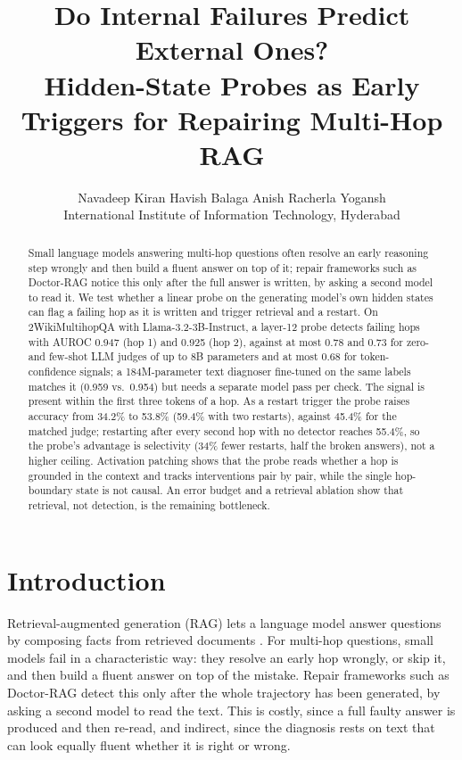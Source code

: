 \documentclass[11pt]{article}
\title{Do Internal Failures Predict External Ones?\\
Hidden-State Probes as Early Triggers for Repairing Multi-Hop RAG}
\author{Navadeep Kiran \quad Havish Balaga \quad Anish Racherla \quad Yogansh \\
  International Institute of Information Technology, Hyderabad}
\begin{document}
\maketitle

\begin{abstract}
Small language models answering multi-hop questions often resolve an early reasoning step wrongly and then build a fluent answer on top of it; repair frameworks such as Doctor-RAG notice this only after the full answer is written, by asking a second model to read it. We test whether a linear probe on the generating model's own hidden states can flag a failing hop as it is written and trigger retrieval and a restart. On 2WikiMultihopQA with Llama-3.2-3B-Instruct, a layer-12 probe detects failing hops with AUROC 0.947 (hop 1) and 0.925 (hop 2), against at most 0.78 and 0.73 for zero- and few-shot LLM judges of up to 8B parameters and at most 0.68 for token-confidence signals; a 184M-parameter text diagnoser fine-tuned on the same labels matches it (0.959 vs.\ 0.954) but needs a separate model pass per check. The signal is present within the first three tokens of a hop. As a restart trigger the probe raises accuracy from 34.2\% to 53.8\% (59.4\% with two restarts), against 45.4\% for the matched judge; restarting after every second hop with no detector reaches 55.4\%, so the probe's advantage is selectivity (34\% fewer restarts, half the broken answers), not a higher ceiling. Activation patching shows that the probe reads whether a hop is grounded in the context and tracks interventions pair by pair, while the single hop-boundary state is not causal. An error budget and a retrieval ablation show that retrieval, not detection, is the remaining bottleneck.
\end{abstract}

\section{Introduction}

Retrieval-augmented generation (RAG) lets a language model answer questions by composing facts from retrieved documents \citep{lewis2020retrieval}. For multi-hop questions, small models fail in a characteristic way: they resolve an early hop wrongly, or skip it, and then build a fluent answer on top of the mistake. Repair frameworks such as Doctor-RAG \citep{jiao2026doctor} detect this only after the whole trajectory has been generated, by asking a second model to read the text. This is costly, since a full faulty answer is produced and then re-read, and indirect, since the diagnosis rests on text that can look equally fluent whether it is right or wrong.
\end{document}

